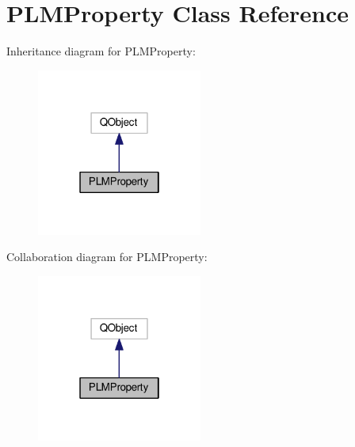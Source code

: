 \hypertarget{class_p_l_m_property}{}\section{P\+L\+M\+Property Class Reference}
\label{class_p_l_m_property}


Inheritance diagram for P\+L\+M\+Property\+:\nopagebreak
\begin{figure}[H]
\begin{center}
\leavevmode
\includegraphics[width=154pt]{class_p_l_m_property__inherit__graph}
\end{center}
\end{figure}


Collaboration diagram for P\+L\+M\+Property\+:\nopagebreak
\begin{figure}[H]
\begin{center}
\leavevmode
\includegraphics[width=154pt]{class_p_l_m_property__coll__graph}
\end{center}
\end{figure}
